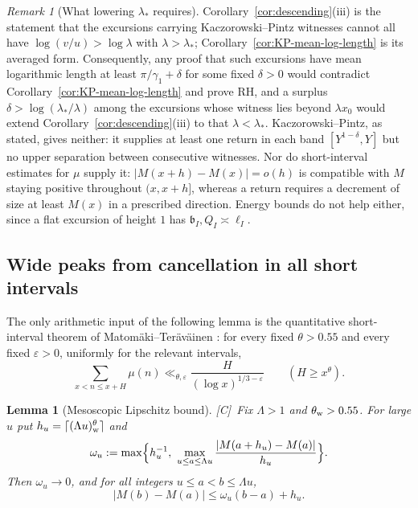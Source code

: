 \documentclass[11pt]{amsart}
\numberwithin{equation}{section}
\theoremstyle{plain}
\newtheorem{lemma}[theorem]{Lemma}
\theoremstyle{definition}
\theoremstyle{remark}
\newtheorem{remark}[theorem]{Remark}
\newcommand{\tagC}{\textup{[C]}}
\begin{document}
\begin{remark}[What lowering $\lambda_*$ requires]
\label{rem:surplus}
Corollary~\ref{cor:descending}(iii) is the statement that the
excursions carrying Kaczorowski--Pintz witnesses cannot all have
$\log(v/u)>\log\lambda$ with $\lambda>\lambda_*$;
Corollary~\ref{cor:KP-mean-log-length} is its averaged form. Consequently,
any proof that such excursions have mean logarithmic length at least
$\pi/\gamma_1+\delta$ for some fixed $\delta>0$ would contradict
Corollary~\ref{cor:KP-mean-log-length} and prove RH, and a surplus
$\delta>\log(\lambda_*/\lambda)$ among the excursions whose witness lies
beyond $\lambda x_0$ would extend Corollary~\ref{cor:descending}(iii) to
that $\lambda<\lambda_*$. Kaczorowski--Pintz, as stated, gives neither: it
supplies at least one return in each band $[Y^{1-\delta},Y]$ but no upper
separation between consecutive witnesses. Nor do short-interval estimates
for $\mu$ supply it: $|M(x+h)-M(x)|=o(h)$ is compatible with $M$ staying
positive throughout $(x,x+h]$, whereas a return requires a decrement of
size at least $M(x)$ in a prescribed direction. Energy bounds do not help
either, since a flat excursion of height $1$ has $\mathfrak b_I,Q_I\asymp\ell_I$.
\end{remark}

\subsection*{Wide peaks from cancellation in all short intervals}

The only arithmetic input of the following lemma is the quantitative short-interval theorem of
Matom\"aki--Ter\"av\"ainen \cite[Theorem~1.1]{MatomakiTeravainen2023}: for every fixed
$\theta>0.55$ and every fixed $\varepsilon>0$, uniformly for the relevant intervals,
\[
 \sum_{x<n\le x+H}\mu(n)
 \ll_{\theta,\varepsilon} \frac{H}{(\log x)^{1/3-\varepsilon}}
 \qquad(H\ge x^\theta).
\]

\begin{lemma}[Mesoscopic Lipschitz bound]
\label{lem:meso-lipschitz}
\tagC\ Fix $\Lambda>1$ and $\theta_{\rm w}>0.55$. For large $u$ put
$h_u=\lceil(\Lambda u)^\theta_{\rm w}\rceil$ and
\[
\omega_u:=\max\Bigl\{h_u^{-1},\ \max_{u\le a\le\Lambda u}
\frac{|M(a+h_u)-M(a)|}{h_u}\Bigr\}.
\]
Then $\omega_u\to0$, and for all integers $u\le a<b\le\Lambda u$,
\begin{equation}
\label{eq:meso-lipschitz}
|M(b)-M(a)|\le\omega_u(b-a)+h_u .
\end{equation}
\end{lemma}
\end{document}

